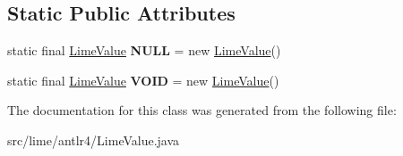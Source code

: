 \subsection*{Static Public Attributes}
\begin{DoxyCompactItemize}
\item 
\mbox{\label{classlime_1_1antlr4_1_1LimeValue_a153d87d8d830fece61c061abc25ddd4a}} 
static final \hyperlink{classlime_1_1antlr4_1_1LimeValue}{Lime\+Value} {\bfseries N\+U\+LL} = new \hyperlink{classlime_1_1antlr4_1_1LimeValue}{Lime\+Value}()
\item 
\mbox{\label{classlime_1_1antlr4_1_1LimeValue_ae1b0cf57a5eb4493d3a0a82a4253829f}} 
static final \hyperlink{classlime_1_1antlr4_1_1LimeValue}{Lime\+Value} {\bfseries V\+O\+ID} = new \hyperlink{classlime_1_1antlr4_1_1LimeValue}{Lime\+Value}()
\end{DoxyCompactItemize}


The documentation for this class was generated from the following file\+:\begin{DoxyCompactItemize}
\item 
src/lime/antlr4/Lime\+Value.\+java\end{DoxyCompactItemize}
